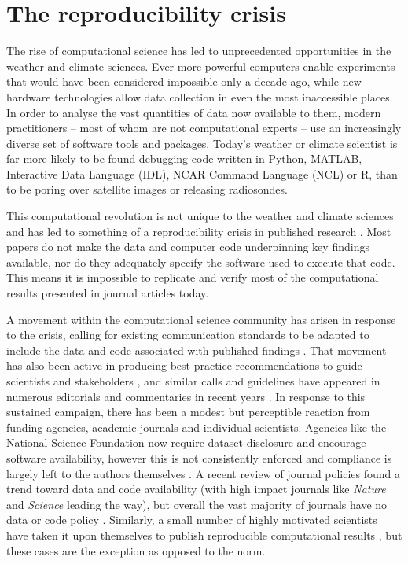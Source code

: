 \section{The reproducibility crisis}

The rise of computational science has led to unprecedented opportunities in the weather and climate sciences. Ever more powerful computers enable experiments that would have been considered impossible only a decade ago, while new hardware technologies allow data collection in even the most inaccessible places. In order to analyse the vast quantities of data now available to them, modern practitioners – most of whom are not computational experts – use an increasingly diverse set of software tools and packages. Today's weather or climate scientist is far more likely to be found debugging code written in Python, MATLAB, Interactive Data Language (IDL), NCAR Command Language (NCL) or R, than to be poring over satellite images or releasing radiosondes. 

This computational revolution is not unique to the weather and climate sciences and has led to something of a reproducibility crisis in published research \citep[e.g.][]{Peng2011}. Most papers do not make the data and computer code underpinning key findings available, nor do they adequately specify the software used to execute that code. This means it is impossible to replicate and verify most of the computational results presented in journal articles today.

A movement within the computational science community has arisen in response to the crisis, calling for existing communication standards to be adapted to include the data and code associated with published findings \citep[e.g.][]{Stodden2014}. That movement has also been active in producing best practice recommendations to guide scientists and stakeholders \citep[e.g.][]{Prlic2012,Sandve2013,Stodden2012a,Stodden2014}, and similar calls and guidelines have appeared in numerous editorials and commentaries in recent years \citep[e.g.][]{Barnes2010,Ince2012,Merali2010}. In response to this sustained campaign, there has been a modest but perceptible reaction from funding agencies, academic journals and individual scientists. Agencies like the National Science Foundation now require dataset disclosure and encourage software availability, however this is not consistently enforced and compliance is largely left to the authors themselves \citep{Stodden2013}. A recent review of journal policies found a trend toward data and code availability (with high impact journals like \textit{Nature} and \textit{Science} leading the way), but overall the vast majority of journals have no data or code policy \citep{Stodden2013}. Similarly, a small number of highly motivated scientists have taken it upon themselves to publish reproducible computational results \citep[e.g.][]{Crooks2014,Ketcheson2012,Schmitt2015}, but these cases are the exception as opposed to the norm.

